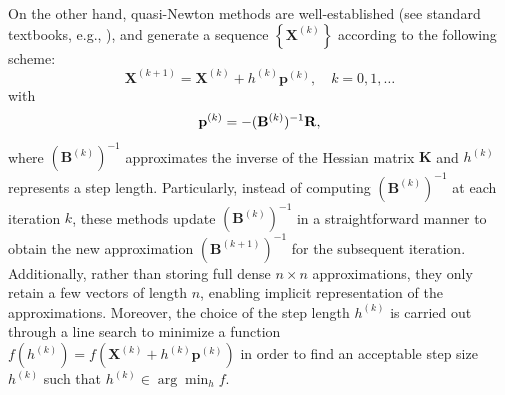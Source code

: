 On the other hand, quasi-Newton methods are well-established (see standard textbooks, e.g., \cite{Nocedal1999-zr,Nocedal2006-qh}), and generate a sequence $\left\{\mathbf{X}^{(k)}\right\}$ according to the following scheme:
\begin{equation}
\mathbf{X}^{(k+1)} = \mathbf{X}^{(k)} + h^{(k)} \mathbf{p} ^{(k)}, \quad k=0,1,\ldots
\end{equation}
with
\begin{equation}
\mathbf{p}^{(k)}=-(\mathbf{B}^{(k)})^{-1}{\bf R},
\end{equation}
where $(\mathbf{B}^{(k)})^{-1}$ approximates the inverse of the Hessian matrix  $\mathbf{K}$ and $h^{(k)}$ represents a step length. Particularly, instead of computing $(\mathbf{B}^{(k)})^{-1}$  at each iteration $k$, these methods update $(\mathbf{B}^{(k)})^{-1}$ in a straightforward manner to obtain the new approximation $(\mathbf{B}^{(k+1)})^{-1}$  for the subsequent iteration. Additionally, rather than storing full dense $n \times n$ approximations, they only retain a few vectors of length $n$, enabling implicit representation of the approximations. Moreover, the choice of the step length $h^{(k)}$ is carried out through a line search to minimize a function $f(h^{(k)}) = f(\mathbf{X}^{(k)} + h^{(k)} \mathbf{p}^{(k)})$ in order to find an acceptable step size $h^{(k)}$ such that $h^{(k)} \in \arg \min_{h} f$.

